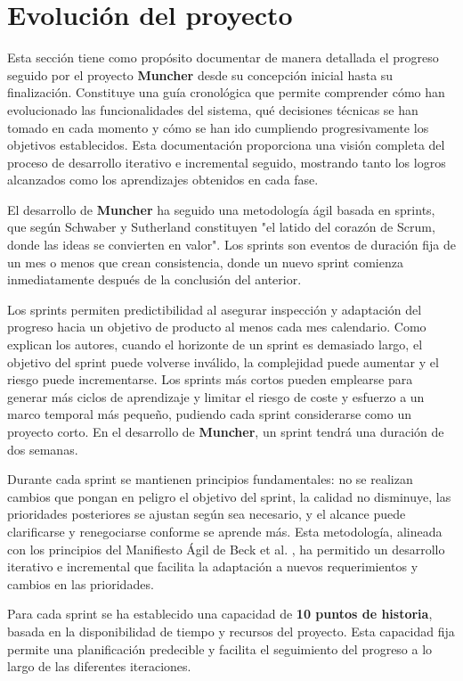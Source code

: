 \section*{Evolución del proyecto}

Esta sección tiene como propósito documentar de manera detallada el progreso
seguido por el proyecto \textbf{Muncher} desde su concepción inicial hasta su
finalización. Constituye una guía cronológica que permite comprender cómo han
evolucionado las funcionalidades del sistema, qué decisiones técnicas se han
tomado en cada momento y cómo se han ido cumpliendo progresivamente los
objetivos establecidos. Esta documentación proporciona una visión completa del
proceso de desarrollo iterativo e incremental seguido, mostrando tanto los
logros alcanzados como los aprendizajes obtenidos en cada fase.

El desarrollo de \textbf{Muncher} ha seguido una metodología ágil basada en
sprints, que según Schwaber y Sutherland \cite{Schwaber2020} constituyen "el
latido del corazón de Scrum, donde las ideas se convierten en valor". Los
sprints son eventos de duración fija de un mes o menos que crean consistencia,
donde un nuevo sprint comienza inmediatamente después de la conclusión del
anterior.

Los sprints permiten predictibilidad al asegurar inspección y adaptación del
progreso hacia un objetivo de producto al menos cada mes calendario. Como
explican los autores, cuando el horizonte de un sprint es demasiado largo, el
objetivo del sprint puede volverse inválido, la complejidad puede aumentar y el
riesgo puede incrementarse. Los sprints más cortos pueden emplearse para
generar más ciclos de aprendizaje y limitar el riesgo de coste y esfuerzo a un
marco temporal más pequeño, pudiendo cada sprint considerarse como un proyecto
corto. En el desarrollo de \textbf{Muncher}, un sprint tendrá una duración de
dos semanas.

Durante cada sprint se mantienen principios fundamentales: no se realizan
cambios que pongan en peligro el objetivo del sprint, la calidad no disminuye,
las prioridades posteriores se ajustan según sea necesario, y el alcance puede
clarificarse y renegociarse conforme se aprende más. Esta metodología, alineada
con los principios del Manifiesto Ágil de Beck et al. \cite{Beck2001}, ha
permitido un desarrollo iterativo e incremental que facilita la adaptación a
nuevos requerimientos y cambios en las prioridades.

Para cada sprint se ha establecido una capacidad de \textbf{10 puntos de
	historia}, basada en la disponibilidad de tiempo y recursos del proyecto. Esta
capacidad fija permite una planificación predecible y facilita el seguimiento
del progreso a lo largo de las diferentes iteraciones.

